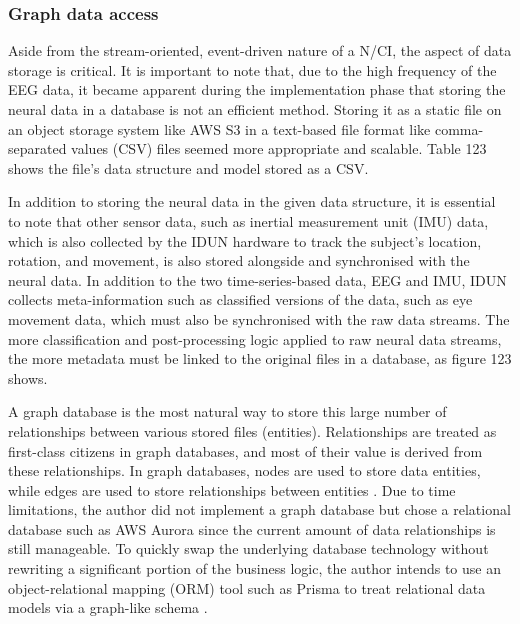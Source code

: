 \subsubsection{Graph data access}
\label{chapter5-graph-data-access}

Aside from the stream-oriented, event-driven nature of a N/CI, the aspect of data storage is critical. It is important to note that, due to the high frequency of the EEG data, it became apparent during the implementation phase that storing the neural data in a database is not an efficient method. Storing it as a static file on an object storage system like AWS S3 in a text-based file format like comma-separated values (CSV) files seemed more appropriate and scalable. Table 123 shows the file's data structure and model stored as a CSV.


In addition to storing the neural data in the given data structure, it is essential to note that other sensor data, such as inertial measurement unit (IMU) data, which is also collected by the IDUN hardware to track the subject's location, rotation, and movement, is also stored alongside and synchronised with the neural data. In addition to the two time-series-based data, EEG and IMU, IDUN collects meta-information such as classified versions of the data, such as eye movement data, which must also be synchronised with the raw data streams. The more classification and post-processing logic applied to raw neural data streams, the more metadata must be linked to the original files in a database, as figure 123 shows.


A graph database is the most natural way to store this large number of relationships between various stored files (entities). Relationships are treated as first-class citizens in graph databases, and most of their value is derived from these relationships. In graph databases, nodes are used to store data entities, while edges are used to store relationships between entities \citep{amazon_web_services_inc_what_nodate}. Due to time limitations, the author did not implement a graph database but chose a relational database such as AWS Aurora since the current amount of data relationships is still manageable. To quickly swap the underlying database technology without rewriting a significant portion of the business logic, the author intends to use an object-relational mapping (ORM) tool such as Prisma to treat relational data models via a graph-like schema \citep{prisma_data_nodate}.


